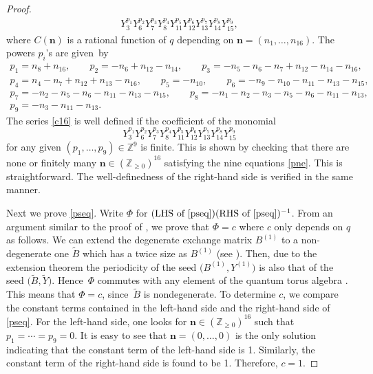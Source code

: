 \documentclass[pdftex]{sigma}
\newcommand{\Z}{{\mathbb Z}}
\numberwithin{equation}{section}
\begin{document}
\begin{proof}
\begin{gather}
 Y_3^{p_1} Y_6^{p_2} Y_7^{p_3} Y_8^{p_4} Y_{11}^{p_5} Y_{12}^{p_6} Y_{13}^{p_7} Y_{14}^{p_8}Y_{15}^{p_9},\label{c16}
 \end{gather}
 where $C(\mathbf{n})$ is a rational function of $q$ depending on
 $\mathbf{n}=(n_1, \dotsc, n_{16})$. The powers $p_i$'s are given~by
\begin{gather}
p_1 = n_8+n_{16},\qquad p_2 = -n_6+n_{12}-n_{14},\qquad p_3 = -n_{5} - n_{6} - n_{7} + n_{12}-n_{14}-n_{16},
\nonumber\\
p_4 = n_4-n_7+n_{12}+n_{13}-n_{16}, \qquad
p_5 = -n_{10},
 \qquad p_6 = -n_9-n_{10}-n_{11}-n_{13}-n_{15},
\nonumber\\
 p_7 = -n_2-n_5-n_{6}-n_{11}-n_{13}-n_{15},
\qquad
 p_8 = -n_1 -n_2-n_3-n_5-n_6 - n_{11}-n_{13},\nonumber\\
 p_9 = -n_3-n_{11}-n_{13}.
\label{pne}
\end{gather}
The series \eqref{c16} is well defined if the coefficient of the monomial
\[
Y_3^{p_1} Y_6^{p_2} Y_7^{p_3} Y_8^{p_4} Y_{11}^{p_5} Y_{12}^{p_6} Y_{13}^{p_7} Y_{14}^{p_8} Y_{15}^{p_9}
\]
for any given $(p_1,\dotsc, p_9) \in \Z^9$ is finite.
This is shown by checking that there are none or finitely many
$\mathbf{n} \in (\Z_{\ge 0})^{16}$
satisfying the nine equations \eqref{pne}.
This is straightforward.
The well-definedness of the right-hand side is verified in the same manner.


Next we prove \eqref{pseq}.
Write $\Phi$ for $(\text{LHS of \eqref{pseq}})(\text{RHS of
\eqref{pseq}})^{-1}$.
From an argument similar to the proof of \cite[Theorem~3.5]{KN11}, we prove
that $\Phi= c$ where $c$ only depends on $q$ as follows.
We can extend the degenerate exchange matrix $B^{(1)}$ to a non-degenerate one
$\tilde{B}$ which has a twice size as $B^{(1)}$ (see \cite[Example 2.5]{KN11}).
Then, due to the extension theorem \cite[Theorem~4.3]{N11} the
periodicity of the seed $\bigl(B^{(1)},Y^{(1)}\bigr)$ is also that of the seed
$\bigl(\tilde{B},\tilde{Y}\bigr)$. Hence~$\Phi$ commutes with any element of the quantum torus algebra
. This means that $\Phi=c$, since~$\tilde{B}$
is nondegenerate.
To determine $c$, we compare the constant terms contained in the
left-hand side and the right-hand side of \eqref{pseq}. For the left-hand side, one looks for
$\mathbf{n} \in (\Z_{\ge 0})^{16}$ such that $p_1 = \dotsb = p_9 = 0$.
It is easy to see that $\mathbf{n}=(0,\dotsc, 0)$ is the only solution
indicating that the constant term of the left-hand side is 1. Similarly, the
constant term of the right-hand side is found to be 1. Therefore, $c=1$.
\end{proof}
\end{document}
